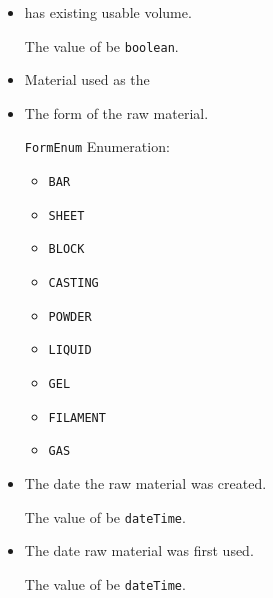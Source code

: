 \begin{itemize}

\item {} \newline {} has existing usable volume.

The value of  \MUST be \texttt{boolean}.

\item {} \newline Material used as the 

\item {} \newline The form of the \gls{raw material}.

\texttt{FormEnum} Enumeration:

\begin{itemize}
\item \texttt{BAR} \newline  
\item \texttt{SHEET} \newline  
\item \texttt{BLOCK} \newline  
\item \texttt{CASTING} \newline  
\item \texttt{POWDER} \newline  
\item \texttt{LIQUID} \newline  
\item \texttt{GEL} \newline  
\item \texttt{FILAMENT} \newline  
\item \texttt{GAS} \newline  
\end{itemize}


\item {} \newline The date the \gls{raw material} was created.

The value of  \MUST be \texttt{dateTime}.

\item {} \newline The date \gls{raw material} was first used.

The value of  \MUST be \texttt{dateTime}.


\end{itemize}
